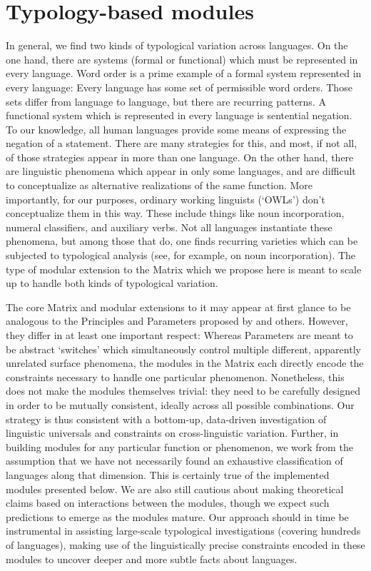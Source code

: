 \documentclass[11pt]{article}
\begin{document}
\section{Typology-based modules}

In general, we find two kinds of typological variation across
languages.  On the one hand, there are systems (formal or functional)
which must be represented in every language.  Word order is a prime
example of a formal system represented in every language: Every
language has some set of permissible word orders.  Those sets differ
from language to language, but there are recurring patterns.
A functional system which is represented in every language is
sentential negation.  To our knowledge, all human languages provide
some means of expressing the negation of a statement.  There are many
strategies for this, and most, if not all, of those strategies appear
in more than one language.  On the other hand, there are linguistic
phenomena which appear in only some languages, and are difficult to
conceptualize as alternative realizations of the same function.  More
importantly, for our purposes, ordinary working linguists (`OWLs')
don't conceptualize them in this way.  These include things like
noun incorporation, numeral classifiers, and auxiliary verbs.
Not all languages instantiate these phenomena, but among those that
do, one finds recurring varieties which can be subjected to typological
analysis (see, for example, \cite{Mithun:84} on noun incorporation).
The type of modular extension to the Matrix which we propose here
is meant to scale up to handle both kinds of typological variation.

The core Matrix and modular extensions to it may appear at first
glance to be analogous to the Principles and Parameters proposed
by  and others.
However, they differ in at least one important respect:
Whereas Parameters are meant to be abstract `switches'
which simultaneously control multiple different, apparently 
unrelated surface phenomena, the modules in the Matrix each directly
encode the constraints necessary to handle one particular phenomenon.
Nonetheless, this does not make the modules themselves trivial:
they need to be carefully designed in order to be mutually
consistent, ideally across all possible combinations.  Our strategy
is thus consistent with a
bottom-up, data-driven investigation of linguistic universals and
constraints on cross-linguistic variation.  Further, in building modules
for any particular function or phenomenon, we work from the assumption
that we have not necessarily found an exhaustive classification of languages
along that dimension.  This is certainly true of the implemented
modules presented below.  We are also still cautious about making
theoretical claims based on interactions between the modules, though
we expect such predictions to emerge as the modules mature.
Our approach should in time be instrumental in assisting large-scale 
typological investigations (covering hundreds of languages), making use
of the linguistically precise constraints encoded in these modules to
uncover deeper and more subtle facts about languages.
\end{document}
